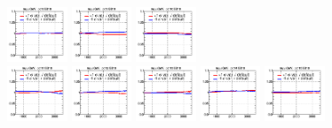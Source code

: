 \begin{figure}[!htbp]
{{\includegraphics[width=0.16\textwidth]{fig/spectra__pdf8_BB18_ADDGRW.png}
\includegraphics[width=0.16\textwidth]{fig/spectra__pdf9_BB18_ADDGRW.png}
\includegraphics[width=0.16\textwidth]{fig/spectra__pdf10_BB18_ADDGRW.png}\\
\includegraphics[width=0.16\textwidth]{fig/spectra__pdf11_BB18_ADDGRW.png}
\includegraphics[width=0.16\textwidth]{fig/spectra__pdf12_BB18_ADDGRW.png}
\includegraphics[width=0.16\textwidth]{fig/spectra__pdf13_BB18_ADDGRW.png}
\includegraphics[width=0.16\textwidth]{fig/spectra__pdf14_BB18_ADDGRW.png}
\includegraphics[width=0.16\textwidth]{fig/spectra__pdf15_BB18_ADDGRW.png}\\
}}
\end{figure}
